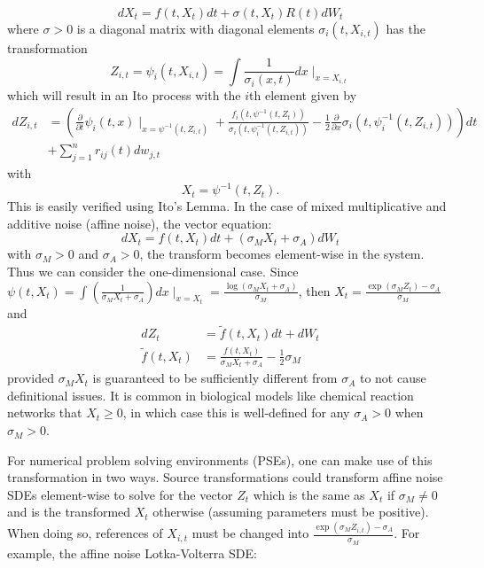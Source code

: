 \documentclass{article}
\begin{document}
\begin{equation}
dX_{t}=f(t,X_{t})dt+\sigma(t,X_{t})R(t)dW_{t}\label{eq:Lamperti}
\end{equation}
where $\sigma>0$ is a diagonal matrix with diagonal elements $\sigma_{i}(t,X_{i,t})$
has the transformation
\begin{equation}
Z_{i,t}=\psi_{i}(t,X_{i,t})=\int\frac{1}{\sigma_{i}(x,t)}dx\mid_{x=X_{i,t}}\label{eq:LampertiIntegral}
\end{equation}
which will result in an Ito process with the $i$th element given
by
\begin{align}
dZ_{i,t}&=\left(\frac{\partial}{\partial t}\psi_{i}(t,x)\mid_{x=\psi^{-1}(t,Z_{i,t})}+\frac{f_{i}(t,\psi^{-1}(t,Z_{t}))}{\sigma_{i}\left(t,\psi_{i}^{-1}\left(t,Z_{i,t}\right)\right)}-\frac{1}{2}\frac{\partial}{\partial x}\sigma_{i}\left(t,\psi_{i}^{-1}\left(t,Z_{i,t}\right)\right)\right)dt\\
&+\sum_{j=1}^{n}r_{ij}(t)dw_{j,t}\label{eq:LampertiTransform}
\end{align}
with
\begin{equation}
X_{t}=\psi^{-1}\left(t,Z_{t}\right).\label{eq:LampertiInv}
\end{equation}
This is easily verified using Ito's Lemma. In the case of mixed multiplicative
and additive noise (affine noise), the vector equation:
\begin{equation}
dX_{t}=f(t,X_{t})dt+\left(\sigma_{M}X_{t}+\sigma_{A}\right)dW_{t}\label{eq:LampertiAffine}
\end{equation}
with $\sigma_{M}>0$ and $\sigma_{A}>0$, the transform becomes element-wise
in the system. Thus we can consider the one-dimensional case. Since
$\psi(t,X_{t})=\int\left(\frac{1}{\sigma_{M}X_{t}+\sigma_{A}}\right)dx\mid_{x=X_{t}}=\frac{\log(\sigma_{M}X_{t}+\sigma_{A})}{\sigma_{M}}$,
then $X_{t}=\frac{\exp\left(\sigma_{M}Z_{t}\right)-\sigma_{A}}{\sigma_{M}}$
and
\begin{align}
dZ_{t} & =\tilde{f}(t,X_{t})dt+dW_{t}\label{eq:LampertiAffineSol}\\
\tilde{f}(t,X_{t}) & =\frac{f(t,X_{t})}{\sigma_{M}X_{t}+\sigma_{A}}-\frac{1}{2}\sigma_{M}\nonumber
\end{align}
provided $\sigma_{M}X_{t}$ is guaranteed to be sufficiently different
from $\sigma_{A}$ to not cause definitional issues. It is common
in biological models like chemical reaction networks that $X_{t}\geq0$,
in which case this is well-defined for any $\sigma_{A}>0$ when $\sigma_{M}>0$.

For numerical problem solving environments (PSEs), one can make use
of this transformation in two ways. Source transformations could transform
affine noise SDEs element-wise to solve for the vector $Z_{t}$ which
is the same as $X_{t}$ if $\sigma_{M}\neq0$ and is the transformed
$X_{t}$ otherwise (assuming parameters must be positive). When doing
so, references of $X_{i,t}$ must be changed into $\frac{\exp(\sigma_{M}Z_{i,t})-\sigma_{A}}{\sigma_{M}}$.
For example, the affine noise Lotka-Volterra SDE:
\end{document}
